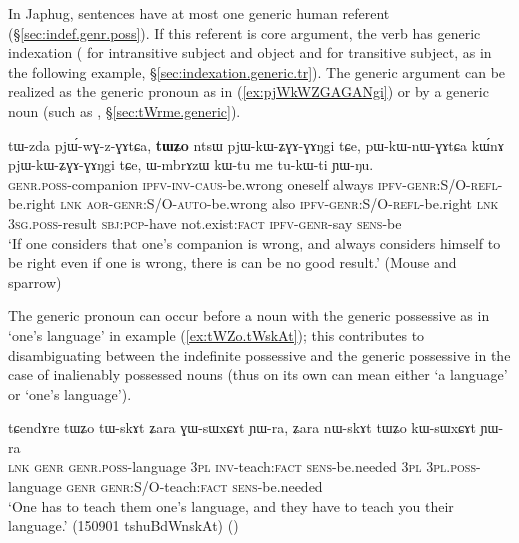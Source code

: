 In Japhug, sentences have at most one generic human referent (§\ref{sec:indef.genr.poss}). If this referent is core argument, the verb has generic indexation ( for intransitive subject and object and  for transitive subject, as in the following example, §\ref{sec:indexation.generic.tr}). The generic argument can be realized as the generic pronoun  as in (\ref{ex:pjWkWZGAGANgi}) or by a generic noun (such as , §\ref{sec:tWrme.generic}).

\begin{exe}
\ex \label{ex:pjWkWZGAGANgi}
\gll tɯ-zda pjɯ́-wɣ-z-ɣɤtɕa, \textbf{tɯʑo} ntsɯ pjɯ-kɯ-ʑɣɤ-ɣɤŋgi tɕe, pɯ-kɯ-nɯ-ɣɤtɕa kɯ́nɤ pjɯ-kɯ-ʑɣɤ-ɣɤŋgi tɕe, ɯ-mbrɤzɯ kɯ-tu me tu-kɯ-ti ɲɯ-ŋu.   \\
\textsc{genr}.\textsc{poss}-companion \textsc{ipfv}-\textsc{inv}-\textsc{caus}-be.wrong oneself always \textsc{ipfv}-\textsc{genr}:S/O-\textsc{refl}-be.right \textsc{lnk} \textsc{aor}-\textsc{genr}:S/O-\textsc{auto}-be.wrong also \textsc{ipfv}-\textsc{genr}:S/O-\textsc{refl}-be.right \textsc{lnk} \textsc{3sg}.\textsc{poss}-result \textsc{sbj}:\textsc{pcp}-have  not.exist:\textsc{fact} \textsc{ipfv}-\textsc{genr}-say \textsc{sens}-be \\
\glt  `If one considers that one's companion is wrong, and always considers himself to be right even if one is wrong, there is can be no good result.' (Mouse and sparrow)
\end{exe} 

The generic pronoun can occur before a noun with the generic possessive as in   `one's language' in example (\ref{ex:tWZo.tWskAt}); this contributes to disambiguating between the indefinite possessive and the generic possessive in the case of inalienably possessed nouns (thus on its own  can mean either `a language' or `one's language').

\begin{exe}
\ex \label{ex:tWZo.tWskAt}
\gll tɕendɤre tɯʑo tɯ-skɤt ʑara ɣɯ-sɯxɕɤt ɲɯ-ra, ʑara nɯ-skɤt tɯʑo kɯ-sɯxɕɤt ɲɯ-ra \\
\textsc{lnk} \textsc{genr} \textsc{genr}.\textsc{poss}-language \textsc{3pl} \textsc{inv}-teach:\textsc{fact} \textsc{sens}-be.needed \textsc{3pl} \textsc{3pl}.\textsc{poss}-language \textsc{genr} \textsc{genr}:S/O-teach:\textsc{fact} \textsc{sens}-be.needed \\
\glt `One has to teach them one's language, and they have to teach you their language.'  (150901 tshuBdWnskAt)
()
\end{exe} 

